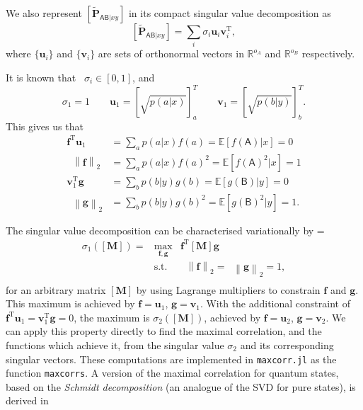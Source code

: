 \documentclass[10pt, a4paper]{article}
\numberwithin{equation}{section} %
\theoremstyle{definition}
\theoremstyle{plain}
\newenvironment{Array}[1] %
{\def\arraystretch{1.75}\everymath={\displaystyle}\begin{equation}\begin{array}{#1}}
{\end{array}\end{equation}}
\newcommand{\norm}[1]{\mathop{}\left\lVert#1\right\rVert}
\newcommand{\?}{\mathrel{?}} %
\newcommand{\R}{\mathbb{R}} %
\newcommand{\tpose}{\mathrm{T}}
\newcommand{\cvec}[1]{\boldsymbol{\mathbf{#1}}}    %
\newcommand{\rvec}[1]{\boldsymbol{\mathbf{#1}}^\tpose} %
\newcommand{\matr}[2][]{\left[\mathbf{#2}#1\right]} %
\newcommand{\E}{\mathbb{E}} %
\newcommand{\crv}[1]{\mathsf{#1}}
\begin{document}
                  We also represent \(\matr[_{\crv{AB}|xy}]{\tilde{P}}\) in its compact singular value decomposition as
                  \begin{equation}
                    \matr[_{\crv{AB}|xy}]{\tilde{P}} = \sum_i \sigma_i \cvec{u}_i \rvec{v}_i,
                  \end{equation}
                  where \(\{\cvec{u}_i\}\) and \(\{\cvec{v}_i\}\) are sets of orthonormal vectors in \(\R^{o_A}\) and \(\R^{o_B}\) respectively.

                  It is known that~\cite[Thm 1]{ComputingMaxCorr} \(\sigma_i \in [0, 1]\), and
                  \begin{equation}
                    \sigma_1 = 1 \qquad \cvec{u}_1 = {[\sqrt{p(a|x)}]}_a^T \qquad \cvec{v}_1 = {[\sqrt{p(b|y)}]}_b^T.
                  \end{equation}
                  This gives us that
                  \begin{align}
                    \rvec{f} \cvec{u}_1 &= \sum_a p(a|x) f(a) = \E[f(\crv{A})|x] = 0 \\
                    \norm{\cvec{f}}_2 &= \sum_a p(a|x) {f(a)}^2 = \E[{f(\crv{A})}^2|x] = 1 \\
                    \rvec{v}_1 \cvec{g} &= \sum_b p(b|y) g(b) = \E[g(\crv{B})|y] = 0 \\
                    \norm{\cvec{g}}_2 &= \sum_b p(b|y) {g(b)}^2 = \E[{g(\crv{B})}^2|y] = 1.
                  \end{align}

                  The singular value decomposition can be characterised variationally by
                  \begin{Array}{rcl}
                    \sigma_1(\matr{M}) = & \max_{\cvec{f},\cvec{g}} & \rvec{f} \matr{M} \cvec{g} \\
                                         & \text{s.t.} & \norm{\cvec{f}}_2 = \norm{\cvec{g}}_2 = 1, \\
                  \end{Array}
                  for an arbitrary matrix \(\matr{M}\) by using Lagrange multipliers to constrain \(\cvec{f}\) and \(\cvec{g}\). This maximum is achieved by \(\cvec{f} = \cvec{u}_1\), \(\cvec{g} = \cvec{v}_1\). With the additional constraint of \(\rvec{f} \cvec{u}_1 = \rvec{v}_1 \cvec{g} = 0\), the maximum is \(\sigma_2(\matr{M})\), achieved by \(\cvec{f} = \cvec{u}_2\), \(\cvec{g} = \cvec{v}_2\). We can apply this property directly to find the maximal correlation, and the functions which achieve it, from the singular value \(\sigma_2\) and its corresponding singular vectors. These computations are implemented in \verb`maxcorr.jl` as the function \verb`maxcorrs`. A version of the maximal correlation for quantum states, based on the \emph{Schmidt decomposition} (an analogue of the SVD for pure states), is derived in~\cite{QuantumDPI}
\end{document}
